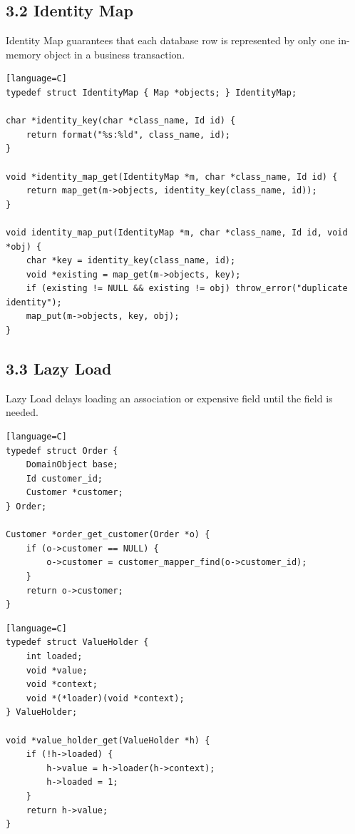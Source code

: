 \documentclass[11pt]{article}
\begin{document}
\subsection{3.2 Identity Map}\label{identity-map}

Identity Map guarantees that each database row is represented by only
one in-memory object in a business transaction.

\begin{verbatim}[language=C]
typedef struct IdentityMap { Map *objects; } IdentityMap;

char *identity_key(char *class_name, Id id) {
    return format("%s:%ld", class_name, id);
}

void *identity_map_get(IdentityMap *m, char *class_name, Id id) {
    return map_get(m->objects, identity_key(class_name, id));
}

void identity_map_put(IdentityMap *m, char *class_name, Id id, void *obj) {
    char *key = identity_key(class_name, id);
    void *existing = map_get(m->objects, key);
    if (existing != NULL && existing != obj) throw_error("duplicate identity");
    map_put(m->objects, key, obj);
}
\end{verbatim}

\subsection{3.3 Lazy Load}\label{lazy-load}

Lazy Load delays loading an association or expensive field until the
field is needed.

\begin{verbatim}[language=C]
typedef struct Order {
    DomainObject base;
    Id customer_id;
    Customer *customer;
} Order;

Customer *order_get_customer(Order *o) {
    if (o->customer == NULL) {
        o->customer = customer_mapper_find(o->customer_id);
    }
    return o->customer;
}
\end{verbatim}

\begin{verbatim}[language=C]
typedef struct ValueHolder {
    int loaded;
    void *value;
    void *context;
    void *(*loader)(void *context);
} ValueHolder;

void *value_holder_get(ValueHolder *h) {
    if (!h->loaded) {
        h->value = h->loader(h->context);
        h->loaded = 1;
    }
    return h->value;
}
\end{verbatim}
\end{document}
